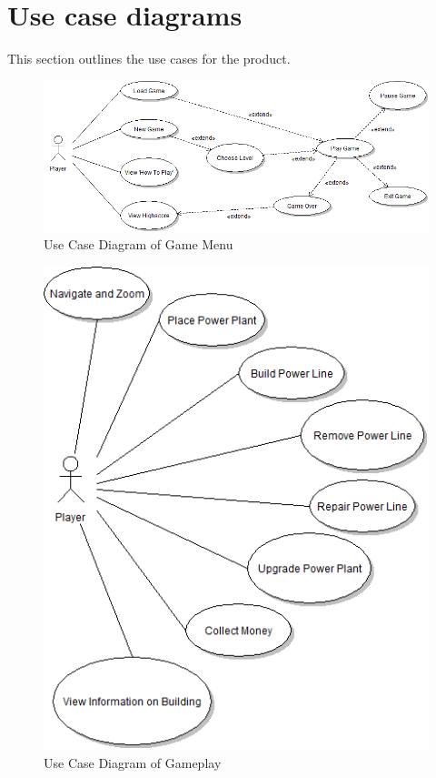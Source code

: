 \section{Use case diagrams}

This section outlines the use cases for the product.

\begin{figure}[H]
  	\centering
	\includegraphics[scale=0.45]{pictures/UCD_Menu.png}
	\caption{Use Case Diagram of Game Menu}
\end{figure}

\begin{figure}[H]
  	\centering
	\includegraphics[scale=0.5]{pictures/UCD_PlayGame.png}
	\caption{Use Case Diagram of Gameplay}
\end{figure}

